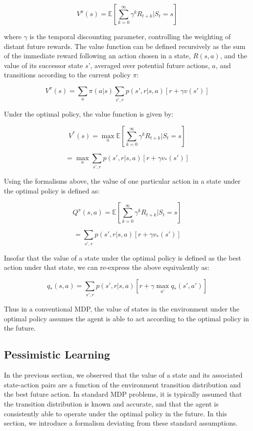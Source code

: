 \documentclass[11pt]{article} %
\begin{document}
$$ V^\pi(s) = \mathbb{E} \left[ \sum^{\infty}_{k=0} \gamma^k R_{t+k} | S_t = s \right] $$

where $\gamma$ is the temporal discounting parameter, controlling the weighting of distant future rewards. The value function can be defined recursively as the sum of the immediate reward following an action chosen in a state, $R(s, a)$, and the value of its successor state $s’$, averaged over potential future actions, $a$, and transitions according to the current policy $\pi$:

$$ V^\pi(s) = \sum_a \pi(a|s) \sum_{s',r}p(s',r|s,a) \left[ r + \gamma v(s') \right] $$

Under the optimal policy, the value function is given by:

$$ V^*(s) = \max_a \mathbb{E} \left[ \sum^{\infty}_{k=0} \gamma^k R_{t+k} | S_t = s \right] $$

$$ = \max_a \sum_{s',r}p(s',r|s,a) \left[ r + \gamma v_*(s') \right] $$

Using the formalisms above, the value of one particular action in a state under the optimal policy is defined as:

$$ Q^\pi(s,a) = \mathbb{E} \left[ \sum^{\infty}_{k=0} \gamma^k R_{t+k} | S_t = s \right] $$

$$ = \sum_{s',r}p(s',r|s,a) \left[ r + \gamma v_*(s') \right] $$

Insofar that the value of a state under the optimal policy is defined as the best action under that state, we can re-express the above equivalently as:

$$ q_*(s,a) = \sum_{s',r}p(s',r|s,a) \left[ r + \gamma \max_{a'} q_*(s',a') \right] $$

Thus in a conventional MDP, the value of states in the environment under the optimal policy assumes the agent is able to act according to the optimal policy in the future.

\subsection{Pessimistic Learning}

In the previous section, we observed that the value of a state and its associated state-action pairs are a function of the environment transition distribution and the best future action. In standard MDP problems, it is typically assumed that the transition distribution is known and accurate, and that the agent is consistently able to operate under the optimal policy in the future. In this section, we introduce a formalism deviating from these standard assumptions.
\end{document}
